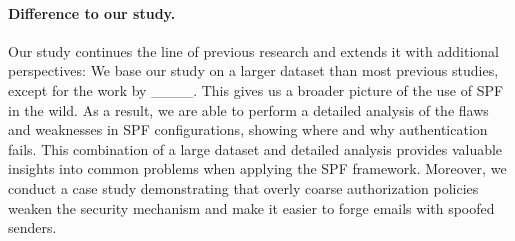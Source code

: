 \paragraph{Difference to our study.}
Our study continues the line of previous research and extends it with additional perspectives:
We base our study on a larger dataset than most previous studies, except for the work by ____.
This gives us a broader picture of the use of \ac{SPF} in the wild.
As a result, we are able to perform a detailed analysis of the flaws and weaknesses in SPF configurations, showing where and why authentication fails.
This combination of a large dataset and detailed analysis provides valuable insights into common problems when applying the SPF framework.
Moreover, we conduct a case study demonstrating that overly coarse authorization policies weaken the security mechanism and make it easier to forge emails with spoofed senders. 

